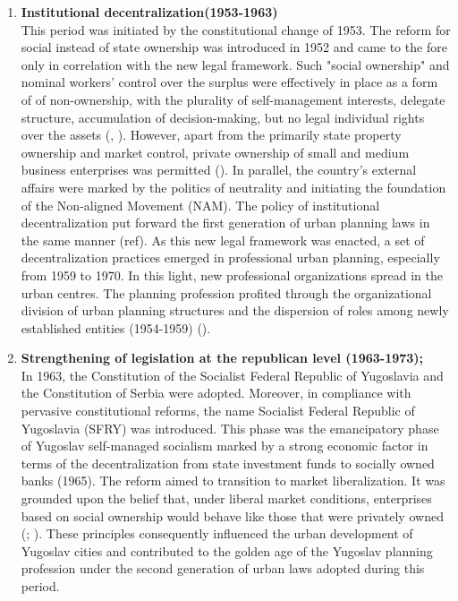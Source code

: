 \documentclass[11pt]{report}
\begin{document}
{{{{\begin{enumerate}
\item  \textbf{Institutional decentralization(1953-1963)}
\\
This period was initiated by the constitutional change of 1953. The reform for social instead of state ownership was introduced in 1952 and came to the fore only in correlation with the new legal framework. Such "social ownership" and nominal workers’ control over the surplus were effectively in place as a form of  of non-ownership, with the plurality of self-management interests, delegate structure, accumulation of decision-making, but no legal individual rights over the assets (\href{Estrin}{\citealt{estrin_yugoslavia:_1991}}, \href{Zec}{\citealt{zec_economic_2012}}).
However, apart from the primarily state property ownership and market control, private ownership of small and medium business enterprises was permitted (\href{Hadzic}{\citealt{hadzic_yugoslav_2002}}).
In parallel, the country’s external affairs were marked by the politics of neutrality and initiating the foundation of the Non-aligned Movement (NAM). The policy of institutional decentralization put forward the first generation of urban planning laws in the same manner (ref). As this new legal framework was enacted, a set of decentralization practices emerged in professional urban planning, especially from 1959 to 1970. In this light, new professional organizations spread in the urban centres. The planning profession profited through the organizational division of urban planning structures and the dispersion of roles among newly established entities (1954-1959) (\href{Nedovic}{\citealt{nedovic-budic_mornings_2011}}). 

\item  \textbf{Strengthening of legislation at the republican level  (1963-1973);}
\\
In 1963, the Constitution of the Socialist Federal Republic of Yugoslavia and the Constitution of Serbia were adopted. Moreover, in compliance with pervasive constitutional reforms, the name Socialist Federal Republic of Yugoslavia (SFRY) was introduced. This phase was the emancipatory phase of Yugoslav self-managed socialism marked by a strong economic factor in terms of the decentralization from state investment funds to socially owned banks (1965). The reform aimed to transition to market liberalization. It was grounded upon the belief that, under liberal market conditions, enterprises based on social ownership would behave like those that were privately owned  (\href{Estrin}{\citealt{estrin_self_1983}}; \href{Zec}{\citealt{zec_economic_2012}}).
These principles consequently influenced the urban development of Yugoslav cities and contributed to the golden age of the Yugoslav planning profession under the second generation of urban laws adopted during this period.
\\


\end{enumerate}}}}}
\end{document}
